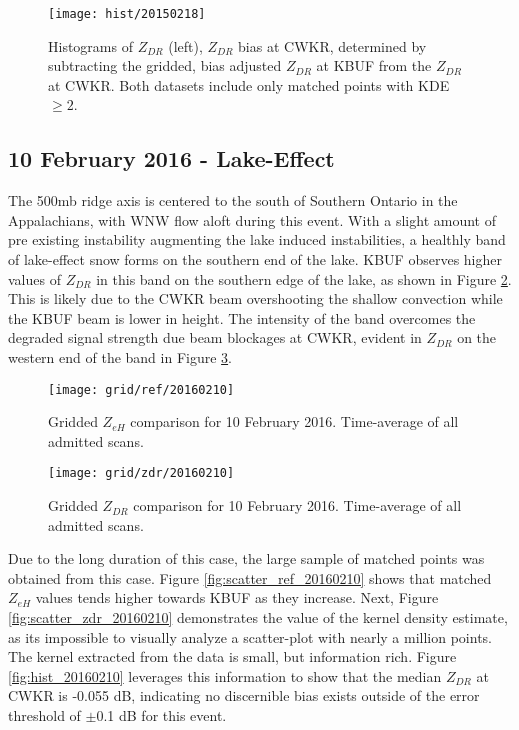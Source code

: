 \begin{figure}[H]
\texttt{[image: hist/20150218]}\centering
\caption{Histograms of $Z_{DR}$ (left), $Z_{DR}$ bias at CWKR, determined by subtracting the gridded, bias adjusted $Z_{DR}$ at KBUF from the $Z_{DR}$ at
CWKR. Both datasets include only matched points with KDE $\geq 2$. } 
\label{fig:hist_20150218}
\end{figure}

\subsection{10 February 2016 - Lake-Effect}
The 500mb ridge axis is centered to the south of Southern Ontario in the Appalachians, with WNW flow aloft during this event. With a slight amount of pre
existing instability augmenting the lake induced instabilities, a healthly band of lake-effect snow forms on the southern end of the lake. KBUF observes
higher values of $Z_{DR}$ in this band on the southern edge of the lake, as shown in Figure \ref{fig:grid_ref_20160210}. This is likely due to the CWKR beam
overshooting the shallow convection while the KBUF beam is lower in height. The intensity of the band overcomes the degraded signal strength due beam
blockages at CWKR, evident in $Z_{DR}$ on the western end of the band in Figure \ref{fig:grid_zdr_20160210}. 
\begin{figure}[H]
\texttt{[image: grid/ref/20160210]}
\caption{Gridded $Z_{eH}$ comparison for 10 February 2016. Time-average of all admitted scans.} 
\label{fig:grid_ref_20160210}
\end{figure}

\begin{figure}[H]
\texttt{[image: grid/zdr/20160210]}
\caption{Gridded $Z_{DR}$ comparison for 10 February 2016. Time-average of all admitted scans.} 
\label{fig:grid_zdr_20160210}
\end{figure}

\vspace{5mm}

Due to the long duration of this case, the large
sample of matched points was obtained from this case. Figure \ref{fig:scatter_ref_20160210} shows that matched $Z_{eH}$ values tends higher towards KBUF as
they increase. Next, Figure \ref{fig:scatter_zdr_20160210} demonstrates the value of the kernel density estimate, as its impossible to visually analyze a
scatter-plot with nearly a million points. The kernel extracted from the data is small, but information rich. Figure \ref{fig:hist_20160210} leverages this
information to show that the median $Z_{DR}$ at CWKR is -0.055 dB, indicating no discernible bias exists outside of the error threshold of $\pm$0.1 dB for
this event.

